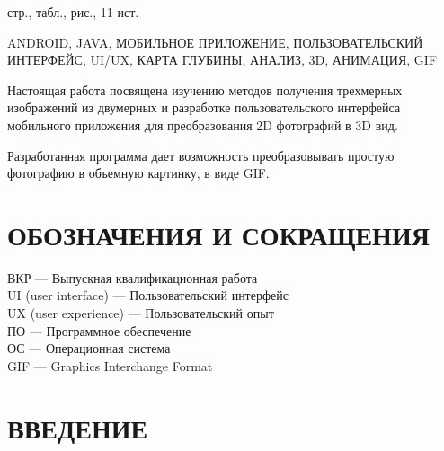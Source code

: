 \documentclass[a4paper,12pt]{article}
\begin{document}
 стр.,  табл.,  рис., 11 ист. 

ANDROID, JAVA, МОБИЛЬНОЕ ПРИЛОЖЕНИЕ, ПОЛЬЗОВАТЕЛЬСКИЙ ИНТЕРФЕЙС, UI/UX, КАРТА ГЛУБИНЫ, АНАЛИЗ, 3D, АНИМАЦИЯ, GIF

Настоящая работа посвящена изучению методов получения трехмерных изображений из двумерных и разработке пользовательского интерфейса мобильного приложения для преобразования 2D фотографий в 3D вид. 

Разработанная программа дает возможность преобразовывать простую фотографию в объемную картинку, в виде GIF.

\pagebreak
\thispagestyle{empty}

\section*{\centering ОБОЗНАЧЕНИЯ И СОКРАЩЕНИЯ}

ВКР --- Выпускная квалификационная работа\\

UI (user interface) --- Пользовательский интерфейс\\

UX (user experience) --- Пользовательский опыт\\

ПО --- Программное обеспечение\\

ОС --- Операционная система\\

GIF --- Graphics Interchange Format\\


\pagebreak

\tableofcontents

\pagebreak

\section*{\centering ВВЕДЕНИЕ}
\pagebreak

%
\pagebreak
\pagebreak
\pagebreak
\pagebreak
\pagebreak
\pagebreak
\end{document}

